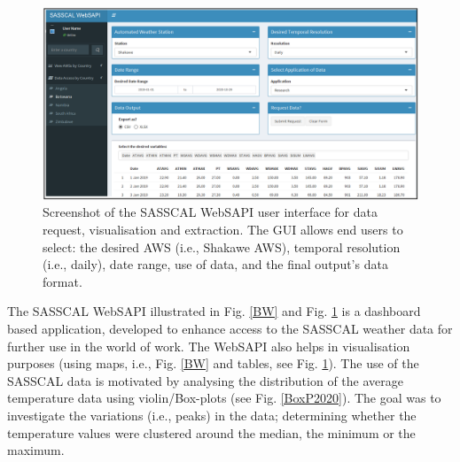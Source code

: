 \documentclass[a4paper, 10pt, conference]{ieeeconf}      %
\begin{document}
\begin{figure}
	\centering
	\includegraphics[width=1\linewidth, height=0.4\textheight]{fig/BW_Data}
	\caption{Screenshot of the SASSCAL WebSAPI user interface for data request, visualisation and extraction. 
 The GUI allows end users to select: the desired AWS (i.e., Shakawe AWS),    temporal resolution (i.e., daily),  date range,  use of data, and  the final output's  data format. 
}
	\label{SASSCAL_WebSAPIA}
\end{figure}


\twocolumn
\noindent



%
\noindent
The  SASSCAL WebSAPI illustrated in Fig. \ref{BW} and Fig. \ref{SASSCAL_WebSAPIA} is a dashboard  based application,  developed to enhance access to the SASSCAL weather data for further use in the world of work.
The WebSAPI also helps in visualisation purposes (using maps, i.e., Fig. \ref{BW} and  tables, see Fig. \ref{SASSCAL_WebSAPIA}). 
The use of the SASSCAL data is motivated by  analysing the distribution of the  average  temperature data using    violin/Box-plots  (see Fig. \ref{BoxP2020}). 
The goal  was to investigate the variations (i.e., peaks) in the  data;  determining whether the temperature values were clustered around the median, the minimum or the maximum. 
\end{document}
